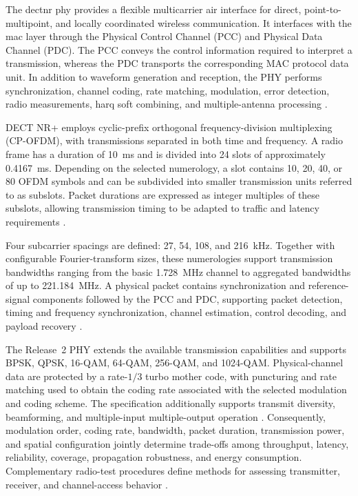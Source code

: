 The \gls{dectnr} \gls{phy} provides a flexible multicarrier air interface for direct, point-to-multipoint, and locally coordinated wireless communication. It interfaces with the \gls{mac} layer through the Physical Control Channel (PCC) and Physical Data Channel (PDC). The PCC conveys the control information required to interpret a transmission, whereas the PDC transports the corresponding MAC protocol data unit. In addition to waveform generation and reception, the PHY performs synchronization, channel coding, rate matching, modulation, error detection, radio measurements, \gls{harq} soft combining, and multiple-antenna processing \cite{etsi_ts103636_3,etsi_ts_103636_1_r2,etsi_ts_103636_3_r2}.

DECT NR+ employs cyclic-prefix orthogonal frequency-division multiplexing (CP-OFDM), with transmissions separated in both time and frequency. A radio frame has a duration of 10~ms and is divided into 24 slots of approximately 0.4167~ms. Depending on the selected numerology, a slot contains 10, 20, 40, or 80 OFDM symbols and can be subdivided into smaller transmission units referred to as subslots. Packet durations are expressed as integer multiples of these subslots, allowing transmission timing to be adapted to traffic and latency requirements \cite{etsi_ts103636_3,etsi_ts_103636_3_r2}.

Four subcarrier spacings are defined: 27, 54, 108, and 216~kHz. Together with configurable Fourier-transform sizes, these numerologies support transmission bandwidths ranging from the basic 1.728~MHz channel to aggregated bandwidths of up to 221.184~MHz. A physical packet contains synchronization and reference-signal components followed by the PCC and PDC, supporting packet detection, timing and frequency synchronization, channel estimation, control decoding, and payload recovery \cite{etsi_ts_103636_3_r2}.

The Release~2 PHY extends the available transmission capabilities and supports BPSK, QPSK, 16-QAM, 64-QAM, 256-QAM, and 1024-QAM. Physical-channel data are protected by a rate-$1/3$ turbo mother code, with puncturing and rate matching used to obtain the coding rate associated with the selected modulation and coding scheme. The specification additionally supports transmit diversity, beamforming, and multiple-input multiple-output operation \cite{etsi_ts_103636_3_r2}. Consequently, modulation order, coding rate, bandwidth, packet duration, transmission power, and spatial configuration jointly determine trade-offs among throughput, latency, reliability, coverage, propagation robustness, and energy consumption. Complementary radio-test procedures define methods for assessing transmitter, receiver, and channel-access behavior \cite{etsi_tr_103810,etsi_ts_103776}.

